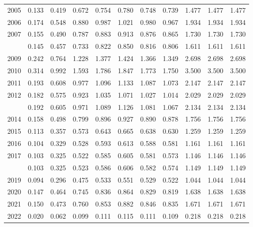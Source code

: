 \documentclass[
]{article}
\begin{document}
\begin{longtable}[t]{lrrrrrrrrrr}
2005 & 0.133 & 0.419 & 0.672 & 0.754 & 0.780 & 0.748 & 0.739 & 1.477 & 1.477 & 1.477\\
2006 & 0.174 & 0.548 & 0.880 & 0.987 & 1.021 & 0.980 & 0.967 & 1.934 & 1.934 & 1.934\\
2007 & 0.155 & 0.490 & 0.787 & 0.883 & 0.913 & 0.876 & 0.865 & 1.730 & 1.730 & 1.730\\
\addlinespace
2008 & 0.145 & 0.457 & 0.733 & 0.822 & 0.850 & 0.816 & 0.806 & 1.611 & 1.611 & 1.611\\
2009 & 0.242 & 0.764 & 1.228 & 1.377 & 1.424 & 1.366 & 1.349 & 2.698 & 2.698 & 2.698\\
2010 & 0.314 & 0.992 & 1.593 & 1.786 & 1.847 & 1.773 & 1.750 & 3.500 & 3.500 & 3.500\\
2011 & 0.193 & 0.608 & 0.977 & 1.096 & 1.133 & 1.087 & 1.073 & 2.147 & 2.147 & 2.147\\
2012 & 0.182 & 0.575 & 0.923 & 1.035 & 1.071 & 1.027 & 1.014 & 2.029 & 2.029 & 2.029\\
\addlinespace
2013 & 0.192 & 0.605 & 0.971 & 1.089 & 1.126 & 1.081 & 1.067 & 2.134 & 2.134 & 2.134\\
2014 & 0.158 & 0.498 & 0.799 & 0.896 & 0.927 & 0.890 & 0.878 & 1.756 & 1.756 & 1.756\\
2015 & 0.113 & 0.357 & 0.573 & 0.643 & 0.665 & 0.638 & 0.630 & 1.259 & 1.259 & 1.259\\
2016 & 0.104 & 0.329 & 0.528 & 0.593 & 0.613 & 0.588 & 0.581 & 1.161 & 1.161 & 1.161\\
2017 & 0.103 & 0.325 & 0.522 & 0.585 & 0.605 & 0.581 & 0.573 & 1.146 & 1.146 & 1.146\\
\addlinespace
2018 & 0.103 & 0.325 & 0.523 & 0.586 & 0.606 & 0.582 & 0.574 & 1.149 & 1.149 & 1.149\\
2019 & 0.094 & 0.296 & 0.475 & 0.533 & 0.551 & 0.529 & 0.522 & 1.044 & 1.044 & 1.044\\
2020 & 0.147 & 0.464 & 0.745 & 0.836 & 0.864 & 0.829 & 0.819 & 1.638 & 1.638 & 1.638\\
2021 & 0.150 & 0.473 & 0.760 & 0.853 & 0.882 & 0.846 & 0.835 & 1.671 & 1.671 & 1.671\\
2022 & 0.020 & 0.062 & 0.099 & 0.111 & 0.115 & 0.111 & 0.109 & 0.218 & 0.218 & 0.218\\*
\end{longtable}
\end{document}
